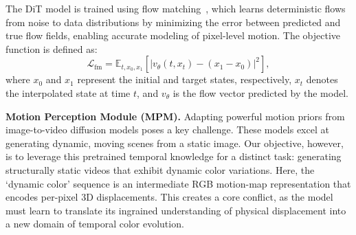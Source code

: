 The DiT model is trained using flow matching~\cite{flow_matching}, which learns deterministic flows from noise to data distributions by minimizing the error between predicted and true flow fields, enabling accurate modeling of pixel-level motion. The objective function is defined as:
\begin{equation}
\mathcal{L}_{\mathrm{fm}} = \mathbb{E}_{t, x_0, x_1} \left[ | v_\theta(t, x_t) - (x_1 - x_0) |^2 \right],
\end{equation}
where $x_0$ and $x_1$ represent the initial and target states, respectively, $x_t$ denotes the interpolated state at time $t$, and $v_\theta$ is the flow vector predicted by the model.

\vspace{3pt}
\noindent\textbf{Motion Perception Module (MPM).} 
Adapting powerful motion priors from image-to-video diffusion models poses a key challenge. These models excel at generating dynamic, moving scenes from a static image. Our objective, however, is to leverage this pretrained temporal knowledge for a distinct task: generating structurally static videos that exhibit dynamic color variations. Here, the ‘dynamic color’ sequence is an intermediate RGB motion-map representation that encodes per-pixel 3D displacements. This creates a core conflict, as the model must learn to translate its ingrained understanding of physical displacement into a new domain of temporal color evolution.

